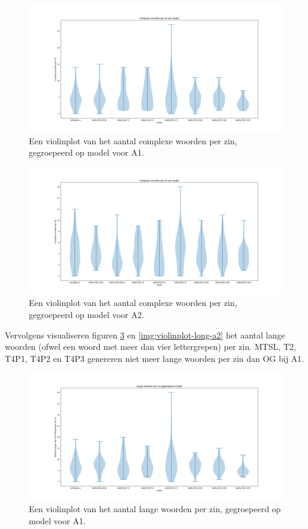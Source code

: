 \begin{figure}[H]
	\includegraphics[width=\linewidth]{img/violinplot-complex-a1.png}
	\caption{Een violinplot van het aantal complexe woorden per zin, gegroepeerd op model voor A1.}
	\label{img:violinplot-complex-a1}
\end{figure}

\begin{figure}[H]
	\includegraphics[width=\linewidth]{img/violinplot-complex-a2.png}
	\caption{Een violinplot van het aantal complexe woorden per zin, gegroepeerd op model voor A2.}
	\label{img:violinplot-complex-a2}
\end{figure}

Vervolgens visualiseren figuren \ref{img:violinplot-long-a1} en \ref{img:violinplot-long-a2} het aantal lange woorden (ofwel een woord met meer dan vier lettergrepen) per zin. MTSL, T2, T4P1, T4P2 en T4P3 genereren niet meer lange woorden per zin dan OG bij A1.

\begin{figure}[H]
	\includegraphics[width=\linewidth]{img/violinplot-long-a1.png}
	\caption{Een violinplot van het aantal lange woorden per zin, gegroepeerd op model voor A1.}
	\label{img:violinplot-long-a1}
\end{figure}

